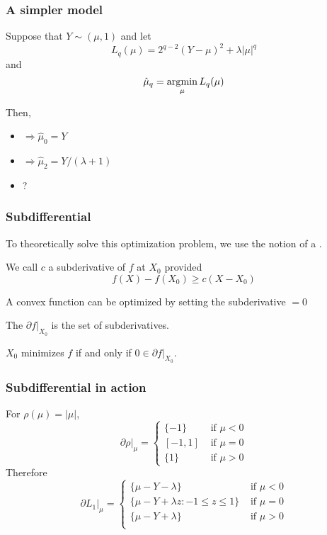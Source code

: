 \documentclass[12pt]{beamer}
\date{}
\begin{document}
\title{}
\subtitle{\classTitle}

\begin{frame}
\maketitle
%
\organization
%
\end{frame}


\begin{frame}
\frametitle{A simpler model}
Suppose that $Y \sim (\mu,1)$ and let 
\[
L_q(\mu) = 2^{q-2}(Y-\mu)^2 + \lambda |\mu|^q
\]
and
\[
\hat{\mu}_q = \operatorname*{\arg\!\min}_{\mu} L_q(\mu)
\]

Then,

\begin{itemize}
\item {} $\Rightarrow \hat{\mu}_0  = Y$  
\item {} $\Rightarrow \hat{\mu}_2  = Y/(\lambda + 1)$  
\item {}?
\end{itemize}
\end{frame}

\begin{frame}
\frametitle{Subdifferential}
To theoretically solve this optimization problem, we use the notion of a .

\vsp
We call $c$ a subderivative of $f$ at $X_0$ provided
\[
f(X) - f(X_0) \geq  c(X - X_0)
\]

A convex function can be optimized by setting the subderivative $= 0$

\vsp
The  $\partial f|_{X_0}$ is the set of subderivatives. 
\vsp

$X_0$ minimizes $f$ if and only if $0 \in \partial f|_{X_0}$.

\end{frame}

\begin{frame}
\frametitle{Subdifferential in action}
For $\rho(\mu) = |\mu|$,
\[
\partial \rho|_{\mu}
=
\begin{cases}
\{ -1\} & \textrm{ if } \mu < 0 \\
[-1,1] & \textrm{ if } \mu = 0 \\
\{ 1\} & \textrm{ if } \mu > 0 
\end{cases}
\]
Therefore
\[
\partial L_1|_{\mu}
=
\begin{cases}
\{ \mu - Y - \lambda\} & \textrm{ if } \mu < 0 \\
\{\mu - Y + \lambda z : -1 \leq z \leq 1 \} & \textrm{ if } \mu = 0 \\
\{ \mu - Y + \lambda\} & \textrm{ if } \mu > 0 \\
\end{cases}
\]

\end{frame}
\end{document}
